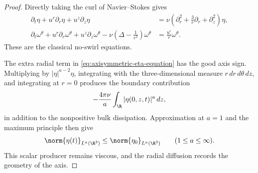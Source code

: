 \begin{proof}
Directly taking the curl of Navier--Stokes
gives
\begin{align}
 \partial_t\eta+u^r\partial_r\eta+u^z\partial_z\eta
 &=\nu\left(
  \partial_r^2+\frac3r\partial_r+\partial_z^2
 \right)\eta,
 \label{eq:axisymmetric-eta-equation}\\
 \partial_t\omega^\theta+u^r\partial_r\omega^\theta
 +u^z\partial_z\omega^\theta
 -\nu\left(\Delta-\frac1{r^2}\right)\omega^\theta
 &=\frac{u^r}{r}\omega^\theta.
 \label{eq:axisymmetric-vorticity-equation}
\end{align}
These are the classical no-swirl equations.

The extra radial term in \eqref{eq:axisymmetric-eta-equation} has the good
axis sign.  Multiplying by \(|\eta|^{a-2}\eta\), integrating with the
three-dimensional measure \(r\,dr\,d\theta\,dz\), and integrating at \(r=0\)
produces the boundary contribution
\begin{equation}
 -\frac{4\pi\nu}{a}\int_{\R}|\eta(0,z,t)|^a\,dz,
 \label{eq:axisymmetric-axis-dissipation}
\end{equation}
in addition to the nonpositive bulk dissipation.  Approximation at
\(a=1\) and the maximum principle then give
\begin{equation}
 \norm{\eta(t)}_{L^a(\R^3)}
 \le\norm{\eta_0}_{L^a(\R^3)}
 \qquad(1\le a\le\infty).
 \label{eq:axisymmetric-eta-producer}
\end{equation}
This scalar producer remains viscous, and the radial diffusion records the
geometry of the axis.


\end{proof}
